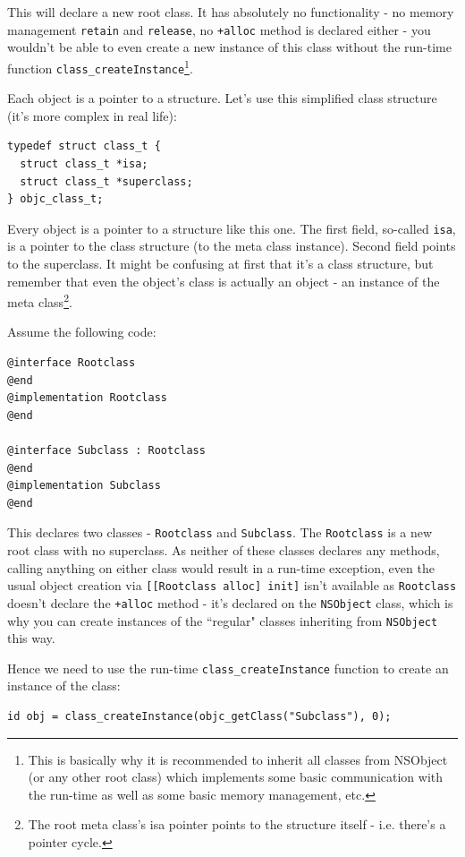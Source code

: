\documentclass[a4paper, 11pt, fleqn]{book}
\begin{document}
This will declare a new root class. It has absolutely no functionality - no memory management \verb=retain= and \verb=release=, no \verb=+alloc= method is declared either - you wouldn't be able to even create a new instance of this class without the run-time function \verb=class_createInstance=\footnote{This is basically why it is recommended to inherit all classes from NSObject (or any other root class) which implements some basic communication with the run-time as well as some basic memory management, etc.}.

Each object is a pointer to a structure. Let's use this simplified class structure (it's more complex in real life):

\begin{verbatim}
typedef struct class_t {
  struct class_t *isa;
  struct class_t *superclass;
} objc_class_t;
\end{verbatim}

Every object is a pointer to a structure like this one. The first field, so-called \verb=isa=, is a pointer to the class structure (to the meta class instance). Second field points to the superclass. It might be confusing at first that it's a class structure, but remember that even the object's class is actually an object - an instance of the meta class\footnote{The root meta class's isa pointer points to the structure itself - i.e. there's a pointer cycle.}.

Assume the following code:
\begin{verbatim}@interface Rootclass
@end
@implementation Rootclass
@end

@interface Subclass : Rootclass
@end
@implementation Subclass
@end 
\end{verbatim}

This declares two classes - \verb=Rootclass= and \verb=Subclass=. The \verb=Rootclass= is a new root class with no superclass. As neither of these classes declares any methods, calling anything on either class would result in a run-time exception, even the usual object creation via \verb=[[Rootclass alloc] init]= isn't available as \verb=Rootclass= doesn't declare the \verb=+alloc= method - it's declared on the \verb=NSObject= class, which is why you can create instances of the ``regular" classes inheriting from \verb=NSObject= this way.

Hence we need to use the run-time \verb=class_createInstance= function to create an instance of the class: 
\begin{verbatim}
id obj = class_createInstance(objc_getClass("Subclass"), 0);
\end{verbatim}
\end{document}

